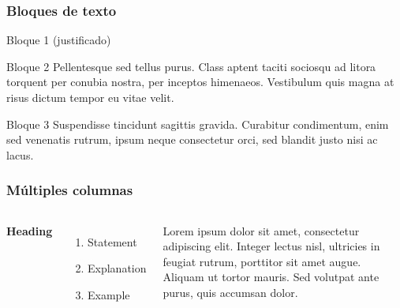 
\begin{frame}
	\frametitle{Bloques de texto}
	\begin{block}{Bloque 1 (justificado)}
	\end{block}
	
	\begin{block}{Bloque 2}
		Pellentesque sed tellus purus. Class aptent taciti sociosqu ad litora torquent per conubia nostra, per inceptos himenaeos. Vestibulum quis magna at risus dictum tempor eu vitae velit.
	\end{block}
	
	\begin{block}{Bloque 3}
		Suspendisse tincidunt sagittis gravida. Curabitur condimentum, enim sed venenatis rutrum, ipsum neque consectetur orci, sed blandit justo nisi ac lacus.
	\end{block}
\end{frame}


\begin{frame}
	\frametitle{Múltiples columnas}
	\begin{columns}[c]
		
		\textbf{Heading}
		\begin{enumerate}
			\item Statement
			\item Explanation
			\item Example
		\end{enumerate}
		
		Lorem ipsum dolor sit amet, consectetur adipiscing elit. Integer lectus nisl, ultricies in feugiat rutrum, porttitor sit amet augue. Aliquam ut tortor mauris. Sed volutpat ante purus, quis accumsan dolor.
		
	\end{columns}
\end{frame}


